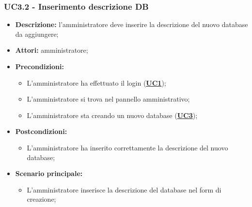 \subsubsection{UC3.2 - Inserimento descrizione DB}
\label{sec:UC3.2}
\begin{itemize}
	\item \textbf{Descrizione:} l’amministratore deve inserire la descrizione del nuovo database da aggiungere;
	\item \textbf{Attori:} amministratore;
	\item \textbf{Precondizioni:} 
	\begin{itemize}
		\item L’amministratore ha effettuato il login (\hyperref[sec:UC1]{\textbf{UC1}});
		\item L’amministratore si trova nel pannello amministrativo;
		\item L’amministratore sta creando un nuovo database (\hyperref[sec:UC3]{\textbf{UC3}});
	\end{itemize}
	\item \textbf{Postcondizioni:} 
	\begin{itemize}
		\item L'amministratore ha inserito correttamente la descrizione del nuovo database;
	\end{itemize}
	\item \textbf{Scenario principale:} 
	\begin{itemize}
		\item L’amministratore inserisce la descrizione del database nel form di creazione;
	\end{itemize}
\end{itemize}

